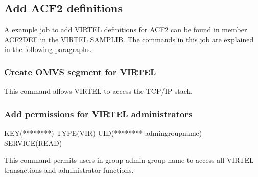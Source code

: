 \documentclass[letterpaper,10pt,english]{sphinxmanual}
\begin{document}
\subsection{Add ACF2 definitions}
\label{\detokenize{Installation_Guide:add-acf2-definitions}}
A example job to add VIRTEL definitions for ACF2 can be found in member ACF2DEF in the VIRTEL SAMPLIB. The commands in this job are explained in the following paragraphs.


\subsubsection{Create OMVS segment for VIRTEL}
\label{\detokenize{Installation_Guide:create-omvs-segment-for-virtel}}
\begin{sphinxVerbatim}[commandchars=\\\{\}]
  
    
\end{sphinxVerbatim}


This command allows VIRTEL to access the TCP/IP stack.


\subsubsection{Add permissions for VIRTEL administrators}
\label{\detokenize{Installation_Guide:add-permissions-for-virtel-administrators}}
\begin{sphinxVerbatim}[commandchars=\\\{\}]
\PYGZdl{}KEY(********) TYPE(VIR) UID(******** admin\PYGZhy{}group\PYGZhy{}name) SERVICE(READ)
\end{sphinxVerbatim}


This command permits users in group admin-group-name to access all VIRTEL transactions and administrator functions.

\ignorespaces 
\end{document}
